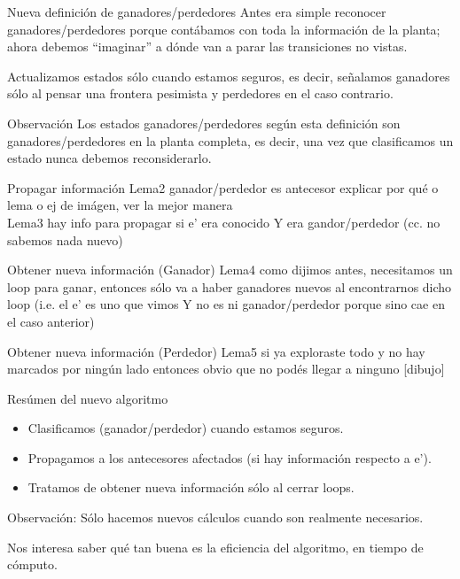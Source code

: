 \begin{frame}{Nueva definición de ganadores/perdedores}
    Antes era simple reconocer ganadores/perdedores porque contábamos con toda la información de la planta; ahora debemos ``imaginar'' a dónde van a parar las transiciones no vistas.
    
    Actualizamos estados sólo cuando estamos seguros, es decir, señalamos ganadores sólo al pensar una frontera pesimista y perdedores en el caso contrario.
    
    \begin{block}{Observación}
        Los estados ganadores/perdedores según esta definición son ganadores/perdedores en la planta completa, es decir, una vez que clasificamos un estado nunca debemos reconsiderarlo.
    \end{block}
\end{frame}
\begin{frame}{Propagar información}
    Lema2 ganador/perdedor es antecesor explicar por qué o lema o ej de imágen, ver la mejor manera\\
    Lema3 hay info para propagar si e' era conocido Y era gandor/perdedor (cc. no sabemos nada nuevo)
\end{frame}
\begin{frame}{Obtener nueva información (Ganador)}
    Lema4 como dijimos antes, necesitamos un loop para ganar, entonces sólo va a haber ganadores nuevos al encontrarnos dicho loop (i.e. el e' es uno que vimos Y no es ni ganador/perdedor porque sino cae en el caso anterior)
\end{frame}
\begin{frame}{Obtener nueva información (Perdedor)}
    Lema5 si ya exploraste todo y no hay marcados por ningún lado entonces obvio que no podés llegar a ninguno [dibujo]
\end{frame}
\begin{frame}{Resúmen del nuevo algoritmo}
    \begin{itemize}
     \item Clasificamos (ganador/perdedor) cuando estamos seguros. %
     \item Propagamos a los antecesores afectados (si hay información respecto a e').
     \item Tratamos de obtener nueva información sólo al cerrar loops.
    \end{itemize}
    
    \begin{block}{Observación:}
        Sólo hacemos nuevos cálculos cuando son realmente necesarios.
    \end{block}
    
    Nos interesa saber qué tan buena es la eficiencia del algoritmo, en tiempo de cómputo.
\end{frame}


